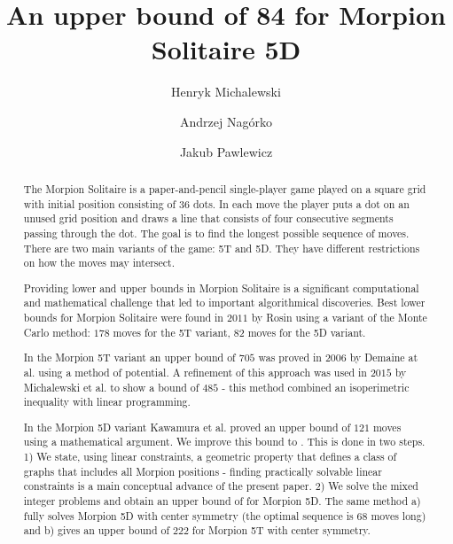 \documentclass[a4paper,UKenglish]{lipics}
\title{{An upper bound of 84 for Morpion Solitaire 5D}}%
\author[1]{Henryk Michalewski}
\author[1]{Andrzej Nagórko}
\author[1]{Jakub Pawlewicz}
\affil[1]{Department of Mathematics, Informatics and Mechanics\\ University of Warsaw\\ \{H.Michalewski,A.Nagorko,J.Pawlewicz\}@mimuw.edu.pl} %
\begin{document}
\maketitle

\begin{abstract} 
The Morpion Solitaire is a paper-and-pencil single-player game played on a square grid with initial position consisting of $36$ dots.
In each move the player puts a dot on an unused grid position and draws a line that 
  consists of four consecutive segments passing through the dot.
 The goal is to find the longest possible sequence of moves.
There are two main variants of the game: 5T and 5D. 
They have different restrictions on how the moves may intersect.

Providing lower and upper bounds in Morpion Solitaire is a significant computational and mathematical challenge
  that led to important algorithmical discoveries.
 Best lower bounds for Morpion Solitaire were found in $2011$ by Rosin using a variant of the Monte Carlo method: 
 $178$ moves for the 5T variant, $82$ moves for the 5D variant.
 
 In the Morpion 5T variant an upper bound of $705$ was proved in $2006$ by Demaine at al. using a method of potential. 
A refinement of this approach was used in $2015$  by Michalewski et al. to show a bound of $485$ - this method combined an isoperimetric inequality with linear programming. 

In the Morpion 5D variant 
Kawamura et al. proved an upper bound of $121$ moves using a mathematical argument. 
We improve this bound to \therecord. 
This is done in two steps.
1) We state, using linear constraints, a geometric property that defines a class of graphs that includes all Morpion  positions - finding practically solvable linear constraints is a main conceptual advance of the present paper.
2) We solve the mixed integer problems and obtain 
an upper bound of \therecord for Morpion 5D. The same method a) fully solves Morpion 5D with center symmetry (the optimal sequence is $68$ moves long) and b) gives an upper bound of $222$ for Morpion 5T with center symmetry. 
\end{abstract}


  



  






\printbibliography 
    
\end{document}
